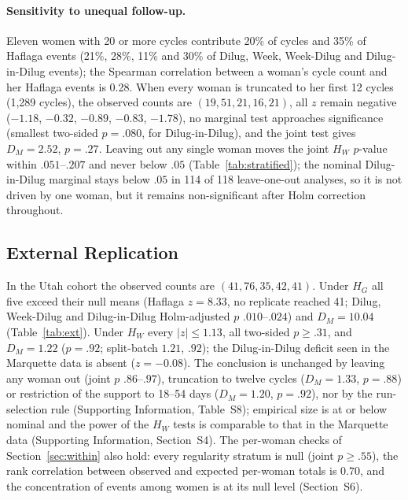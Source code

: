 \documentclass[12pt]{article}
\newcommand{\HG}{H_{G}}
\newcommand{\HW}{H_{W}}
\newcommand{\DM}{D_{M}}
\begin{document}
\paragraph{Sensitivity to unequal follow-up.}
Eleven women with 20 or more cycles contribute 20\% of cycles and 35\% of Haflaga events
(21\%, 28\%, 11\% and 30\% of Dilug, Week, Week-Dilug and Dilug-in-Dilug events); the
Spearman correlation between a woman's cycle count and her Haflaga events is 0.28. When
every woman is truncated to her first 12 cycles (1,289 cycles), the observed counts are
$(19, 51, 21, 16, 21)$, all $z$ remain negative ($-1.18$, $-0.32$, $-0.89$, $-0.83$,
$-1.78$), no marginal test approaches significance (smallest two-sided $p = .080$, for
Dilug-in-Dilug), and the joint test gives $\DM = 2.52$, $p = .27$. Leaving out any single
woman moves the joint $\HW$ $p$-value within $.051$--$.207$ and never below $.05$
(Table~\ref{tab:stratified}); the nominal Dilug-in-Dilug marginal stays below $.05$ in
114 of 118 leave-one-out analyses, so it is not driven by one woman, but it remains
non-significant after Holm correction throughout.

\subsection{External Replication}
\label{sec:extresults}

In the Utah cohort the observed counts are $(41, 76, 35, 42, 41)$. Under $\HG$ all five
exceed their null means (Haflaga $z = 8.33$, no replicate reached 41; Dilug, Week-Dilug
and Dilug-in-Dilug Holm-adjusted $p$ $.010$--$.024$) and $\DM = 10.04$
(Table~\ref{tab:ext}). Under $\HW$ every $|z| \leq 1.13$, all two-sided $p \geq .31$, and
$\DM = 1.22$ ($p = .92$; split-batch $1.21$, $.92$); the Dilug-in-Dilug deficit seen in
the Marquette data is absent ($z = -0.08$). The conclusion is unchanged by leaving any
woman out (joint $p$ $.86$--$.97$), truncation to twelve cycles ($\DM = 1.33$, $p = .88$)
or restriction of the support to 18--54 days ($\DM = 1.20$, $p = .92$), nor by the
run-selection rule (Supporting Information, Table~S8); empirical size is
at or below nominal and the power of the $\HW$ tests is comparable to that in the
Marquette data (Supporting Information, Section~S4). The per-woman checks of
Section~\ref{sec:within} also hold: every regularity stratum is null (joint $p \geq .55$),
the rank correlation between observed and expected per-woman totals is $0.70$, and the
concentration of events among women is at its null level (Section~S6).
\end{document}
